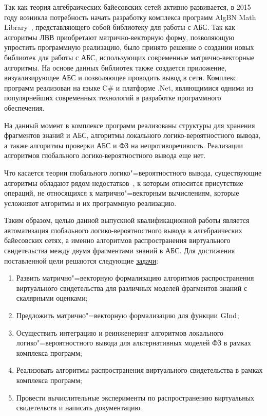 Так как теория алгебраических байесовских сетей активно развивается, в 2015 году возникла потребность начать разработку комплекса программ AlgBN Math Library~\cite{89, 50}, представляющего собой библиотеку для работы с АБС. Так как алгоритмы ЛВВ приобретают матрично-векторную форму, позволяющую упростить программную реализацию, было принято решение о создании новых библиотек для работы с АБС, использующих современные матрично-векторные алгоритмы. На основе данных библиотек также создается приложение, визуализирующее АБС и позволяющее проводить вывод в сети. Комплекс программ реализован на языке C\# и платформе .Net, являющимися одними из популярнейших современных технологий в разработке программного обеспечения. 

На данный момент в комплексе программ реализованы структуры для хранения фрагментов знаний и АБС, алгоритмы локального логико-вероятностного вывода, а также алгоритмы проверки АБС и ФЗ на непротиворечивость. Реализации алгоритмов глобального логико-вероятностного вывода еще нет.

Что касается теории глобального логико"=вероятностного вывода, существующие алгоритмы обладают рядом недостатков~\cite{70}, к 
которым относится присутствие операций, не относящихся к матрично"=векторным вычислениям, которые усложняют алгоритмы и их программную реализацию.

Таким образом, целью данной выпускной квалификационной работы является автоматизация глобального логико-вероятностного вывода в алгебраических
байесовских сетях, а именно алгоритмов распространения виртуального свидетельства между двумя фрагментами знаний в АБС. 
Для достижения поставленной цели решаются следующие \underline{задачи}:
\begin{enumerate}
        \item  Развить матрично"=векторную формализацию алгоритмов распространения виртуального свидетельства для различных моделей фрагментов знаний с скалярными оценками;
        \item Предложить матрично"=векторную формализацию для функции $\mathrm{GInd}$;
        \item Осуществить интеграцию и реинженеринг алгоритмов локального логико"=вероятностного вывода для альтернативных моделей ФЗ в рамках комплекса программ;
    \item Реализовать алгоритмы распространения виртуального свидетельства в рамках комплекса программ;
\item Провести вычислительные эксперименты по распространению виртуальных свидетельств и написать документацию.
\end{enumerate}